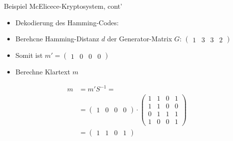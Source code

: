 \documentclass[11pt%
,aspectratio=169%
]{beamer}
\begin{document}
\begin{frame}{Beispiel McElicece-Kryptosystem, cont'}
\begin{itemize}
    \item Dekodierung des Hamming-Codes:
    \item Berehcne Hamming-Distanz $d$ der Generator-Matrix $G$: $\begin{pmatrix} 1 & 3 & 3 & 2 \end{pmatrix}$
    \item Somit ist $m' = \begin{pmatrix} 1 & 0 & 0 & 0\end{pmatrix}$
    \item Berechne Klartext $m$
\end{itemize}

\begin{align*}
        m &= m'S^{-1}=\\
        &= \begin{pmatrix} 1 & 0 & 0 & 0 \end{pmatrix} \cdot \begin{pmatrix} 1 & 1 & 0 & 1 \\ 1 & 1 & 0 & 0 \\ 0 & 1 & 1 & 1 \\ 1 & 0 & 0 & 1 \end{pmatrix}\\
        &= \begin{pmatrix} 1 & 1 & 0 & 1 \end{pmatrix}
\end{align*}
\end{frame}
\end{document}
